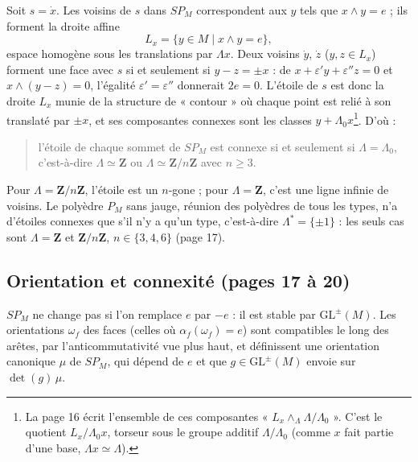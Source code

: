 \documentclass[11pt,a4paper]{article}
\begin{document}
Soit $s = \dot x$. Les voisins de $s$ dans $SP_M$ correspondent aux $y$ tels
que $x \wedge y = e$ ; ils forment la droite affine
\[
  L_x = \{ y \in M \mid x \wedge y = e \},
\]
espace homogène sous les translations par $\Lambda x$. Deux voisins $\dot y$,
$\dot z$ ($y, z \in L_x$) forment une face avec $s$ si et seulement si $y - z =
\pm x$ : de $x + \varepsilon' y + \varepsilon'' z = 0$ et $x \wedge (y - z) =
0$, l'égalité $\varepsilon' = \varepsilon''$ donnerait $2e = 0$. L'étoile de
$s$ est donc la droite $L_x$ munie de la structure de « contour » où chaque
point est relié à son translaté par $\pm x$, et ses composantes connexes sont
les classes $y + \Lambda_0 x$\footnote{La page 16 écrit l'ensemble de ces
composantes « $L_x \wedge_\Lambda \Lambda/\Lambda_0$ ». C'est le quotient
$L_x/\Lambda_0 x$, torseur sous le groupe additif $\Lambda/\Lambda_0$ (comme
$x$ fait partie d'une base, $\Lambda x \simeq \Lambda$).}. D'où :
\begin{quote}
  l'étoile de chaque sommet de $SP_M$ est connexe si et seulement si $\Lambda =
  \Lambda_0$, c'est-à-dire $\Lambda \simeq \mathbf{Z}$ ou $\Lambda \simeq
  \mathbf{Z}/n\mathbf{Z}$ avec $n \geq 3$.
\end{quote}
Pour $\Lambda = \mathbf{Z}/n\mathbf{Z}$, l'étoile est un $n$-gone ; pour
$\Lambda = \mathbf{Z}$, c'est une ligne infinie de voisins. Le polyèdre $P_M$
sans jauge, réunion des polyèdres de tous les types, n'a d'étoiles connexes que
s'il n'y a qu'un type, c'est-à-dire $\Lambda^{*} = \{\pm 1\}$ : les seuls cas
sont $\Lambda = \mathbf{Z}$ et $\mathbf{Z}/n\mathbf{Z}$, $n \in \{3, 4, 6\}$
(page 17).

\subsection*{Orientation et connexité (pages 17 à 20)}

$SP_M$ ne change pas si l'on remplace $e$ par $-e$ : il est stable par
$\mathrm{GL}^{\pm}(M)$. Les orientations $\omega_f$ des faces (celles où
$\alpha_f(\omega_f) = e$) sont compatibles le long des arêtes, par
l'anticommutativité vue plus haut, et définissent une orientation canonique
$\mu$ de $SP_M$, qui dépend de $e$ et que $g \in \mathrm{GL}^{\pm}(M)$ envoie
sur $\det(g)\,\mu$.
\end{document}
